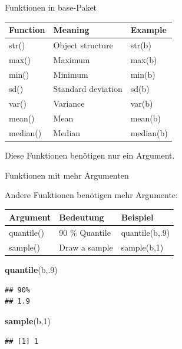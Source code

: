 \documentclass[ignorenonframetext,]{beamer}
\newenvironment{Shaded}{\begin{snugshade}}{\end{snugshade}}
\newcommand{\DecValTok}[1]{\textcolor[rgb]{0.00,0.00,0.81}{#1}}
\newcommand{\KeywordTok}[1]{\textcolor[rgb]{0.13,0.29,0.53}{\textbf{#1}}}
\newcommand{\NormalTok}[1]{#1}
\begin{document}
\begin{frame}{Funktionen in base-Paket}
\protect\hypertarget{funktionen-in-base-paket}{}

\begin{longtable}[]{@{}lll@{}}
\toprule
Function & Meaning & Example\tabularnewline
\midrule
\endhead
str() & Object structure & str(b)\tabularnewline
max() & Maximum & max(b)\tabularnewline
min() & Minimum & min(b)\tabularnewline
sd() & Standard deviation & sd(b)\tabularnewline
var() & Variance & var(b)\tabularnewline
mean() & Mean & mean(b)\tabularnewline
median() & Median & median(b)\tabularnewline
\bottomrule
\end{longtable}

Diese Funktionen benötigen nur ein Argument.

\end{frame}

\begin{frame}[fragile]{Funktionen mit mehr Argumenten}
\protect\hypertarget{funktionen-mit-mehr-argumenten}{}

\begin{block}{Andere Funktionen benötigen mehr Argumente:}

\begin{longtable}[]{@{}lll@{}}
\toprule
Argument & Bedeutung & Beispiel\tabularnewline
\midrule
\endhead
quantile() & 90 \% Quantile & quantile(b,.9)\tabularnewline
sample() & Draw a sample & sample(b,1)\tabularnewline
\bottomrule
\end{longtable}

\begin{Shaded}
\begin{Highlighting}[]
\KeywordTok{quantile}\NormalTok{(b,.}\DecValTok{9}\NormalTok{)}
\end{Highlighting}
\end{Shaded}

\begin{verbatim}
## 90% 
## 1.9
\end{verbatim}

\begin{Shaded}
\begin{Highlighting}[]
\KeywordTok{sample}\NormalTok{(b,}\DecValTok{1}\NormalTok{) }
\end{Highlighting}
\end{Shaded}

\begin{verbatim}
## [1] 1
\end{verbatim}

\end{block}

\end{frame}
\end{document}
